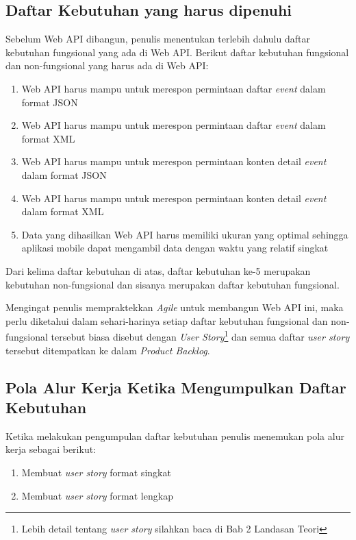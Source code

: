 \documentclass[a4paper, 12pt, oneside]{report}
\begin{document}
\subsection{Daftar Kebutuhan yang harus dipenuhi}
\onehalfspacing Sebelum Web API dibangun, penulis menentukan terlebih dahulu daftar kebutuhan fungsional yang ada di Web API. Berikut daftar kebutuhan fungsional dan non-fungsional yang harus ada di Web API:
\begin{enumerate}
    \item Web API harus mampu untuk merespon permintaan daftar \textit{event} dalam format JSON
    \item Web API harus mampu untuk merespon permintaan daftar \textit{event} dalam format XML
    \item Web API harus mampu untuk merespon permintaan konten detail \textit{event} dalam format JSON
    \item Web API harus mampu untuk merespon permintaan konten detail \textit{event} dalam format XML
    \item Data yang dihasilkan Web API harus memiliki ukuran yang optimal sehingga aplikasi mobile dapat mengambil data dengan waktu yang relatif singkat
\end{enumerate}

\onehalfspacing Dari kelima daftar kebutuhan di atas, daftar kebutuhan ke-5 merupakan kebutuhan non-fungsional dan sisanya merupakan daftar kebutuhan fungsional.

Mengingat penulis mempraktekkan \textit{Agile} untuk membangun Web API ini, maka perlu diketahui dalam sehari-harinya setiap daftar kebutuhan fungsional dan non-fungsional tersebut biasa disebut dengan \textit{User Story}\footnote{Lebih detail tentang \textit{user story} silahkan baca di Bab 2 Landasan Teori} dan semua daftar \textit{user story} tersebut ditempatkan ke dalam \textit{Product Backlog}.

\subsection{Pola Alur Kerja Ketika Mengumpulkan Daftar Kebutuhan}

\onehalfspacing Ketika melakukan pengumpulan daftar kebutuhan penulis menemukan pola alur kerja sebagai berikut:

\begin{enumerate}
  \item Membuat \textit{user story} format singkat
  \item Membuat \textit{user story} format lengkap
\end{enumerate}
\end{document}
